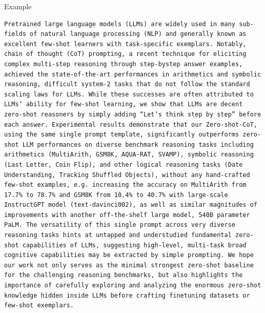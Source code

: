 \documentclass[aspectratio=1610,xcolor={dvipsnames},hyperref={colorlinks,unicode,linkcolor=violet,anchorcolor=BlueViolet,citecolor=YellowOrange,filecolor=black,urlcolor=Aquamarine}]{beamer}
\begin{document}
\begin{frame}{Example}
\begin{verbatim}
Pretrained large language models (LLMs) are widely used in many sub-fields of natural language processing (NLP) and generally known as excellent few-shot learners with task-specific exemplars. Notably, chain of thought (CoT) prompting, a recent technique for eliciting complex multi-step reasoning through step-bystep answer examples, achieved the state-of-the-art performances in arithmetics and symbolic reasoning, difficult system-2 tasks that do not follow the standard scaling laws for LLMs. While these successes are often attributed to LLMs’ ability for few-shot learning, we show that LLMs are decent zero-shot reasoners by simply adding “Let’s think step by step” before each answer. Experimental results demonstrate that our Zero-shot-CoT, using the same single prompt template, significantly outperforms zero-shot LLM performances on diverse benchmark reasoning tasks including arithmetics (MultiArith, GSM8K, AQUA-RAT, SVAMP), symbolic reasoning (Last Letter, Coin Flip), and other logical reasoning tasks (Date Understanding, Tracking Shuffled Objects), without any hand-crafted few-shot examples, e.g. increasing the accuracy on MultiArith from 17.7% to 78.7% and GSM8K from 10.4% to 40.7% with large-scale InstructGPT model (text-davinci002), as well as similar magnitudes of improvements with another off-the-shelf large model, 540B parameter PaLM. The versatility of this single prompt across very diverse reasoning tasks hints at untapped and understudied fundamental zero-shot capabilities of LLMs, suggesting high-level, multi-task broad cognitive capabilities may be extracted by simple prompting. We hope our work not only serves as the minimal strongest zero-shot baseline for the challenging reasoning benchmarks, but also highlights the importance of carefully exploring and analyzing the enormous zero-shot knowledge hidden inside LLMs before crafting finetuning datasets or few-shot exemplars.


\end{verbatim}
\end{frame}
\end{document}
